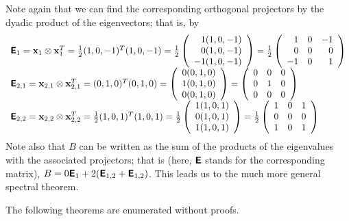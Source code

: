 {Note again that we can find the corresponding orthogonal projectors by the dyadic product
of the eigenvectors; that is,  by
\begin{equation}
\begin{array}{l}
\textsf{\textbf{E}}_1 =
{\bf x}_1 \otimes {\bf x}_1^T =
\frac{1}{2} (1,0,-1)^T(1,0,-1) =
\frac{1}{2}
\left(
\begin{array}{rrrr}
1(1,0,-1)\\
0(1,0,-1)\\
-1(1,0,-1)
\end{array}
\right) =
\frac{1}{2}
\left(
\begin{array}{rrrr}
1&0&-1\\
0&0&0\\
-1&0&1
\end{array}
\right)
\\
\textsf{\textbf{E}}_{2,1} =
{\bf x}_{2,1} \otimes {\bf x}_{2,1}^T =
(0,1,0)^T(0,1,0) =
\left(
\begin{array}{rrrr}
0(0,1,0)\\
1(0,1,0)\\
0(0,1,0)
\end{array}
\right) =
\left(
\begin{array}{rrrr}
0&0&0\\
0&1&0\\
0&0&0
\end{array}
\right)
\\
\textsf{\textbf{E}}_{2,2} =
{\bf x}_{2,2} \otimes {\bf x}_{2,2}^T =
\frac{1}{2} (1,0,1)^T(1,0,1) =
\frac{1}{2}
\left(
\begin{array}{rrrr}
1(1,0,1)\\
0(1,0,1)\\
1(1,0,1)
\end{array}
\right) =
\frac{1}{2}
\left(
\begin{array}{rrrr}
1&0&1\\
0&0&0\\
1&0&1
\end{array}
\right)
\end{array}
\end{equation}
Note also that $B$ can be written as the sum of the products of the
eigenvalues with the associated projectors; that is (here, $\textsf{\textbf{E}}$
stands for the corresponding matrix),
$B= 0  \textsf{\textbf{E}}_1 + 2 (\textsf{\textbf{E}}_{1,2} + \textsf{\textbf{E}}_{1,2} )$.
This leads us to the much more general spectral theorem.
{\textrm{\eexample}}
}


The following theorems are enumerated without proofs.

